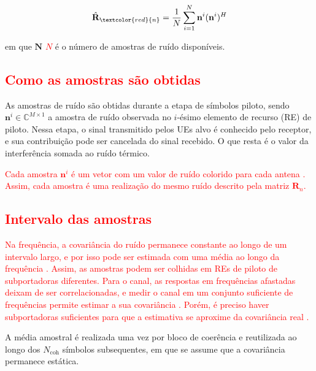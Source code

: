 $$\hat{\mathbf{R}}_{\textcolor{red}{n}}=\frac{1}{N}\sum_{i=1}^{N}\mathbf{n}^i(\mathbf{n}^i)^H$$

em que \sout{$\mathbf{N}$} \textcolor{red}{$N$} é o número de amostras de ruído disponíveis.

\subsection{\texorpdfstring{\textcolor{red}{Como as amostras são obtidas}}{Como as amostras são obtidas}}

As amostras de ruído são obtidas durante a etapa de símbolos piloto, sendo $\mathbf{n}^i \in \mathbb{C}^{M\times1}$ a amostra de ruído observada no $i$-ésimo elemento de recurso (RE) de piloto.  Nessa etapa, o sinal transmitido pelos UEs alvo é conhecido pelo receptor, e sua contribuição pode ser cancelada do sinal recebido. O que resta é o valor da interferência somada ao ruído térmico. 

\textcolor{red}{Cada amostra $\mathbf{n}^i$ é um vetor com um valor de ruído colorido para cada antena \cite{zhao2025jsac}. Assim, cada amostra é uma realização do mesmo ruído descrito pela matriz $\mathbf{R}_n$.}

\subsection{\texorpdfstring{\textcolor{red}{Intervalo das amostras}}{Intervalo das amostras}}

\textcolor{red}{Na frequência, a covariância do ruído permanece constante ao longo de um intervalo largo, e por isso pode ser estimada com uma média ao longo da frequência \cite{zhao2025jsac}. Assim, as amostras podem ser colhidas em REs de piloto de subportadoras diferentes. Para o canal, as respostas em frequências afastadas deixam de ser correlacionadas, e medir o canal em um conjunto suficiente de frequências permite estimar a sua covariância \cite{barriac-madhow}. Porém, é preciso haver subportadoras suficientes para que a estimativa se aproxime da covariância real \cite{barriac-madhow}.}

A média amostral é realizada uma vez por bloco de coerência e reutilizada ao longo dos $N_{\text{coh}}$ símbolos subsequentes, em que se assume que a covariância permanece estática.  


